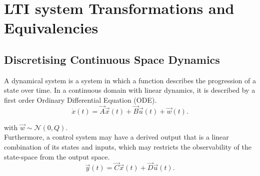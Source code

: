 \documentclass[runningheads,a4paper]{llncs}
\begin{document}
\newpage
\appendix
\section{LTI system Transformations and Equivalencies} \label{sec:appendix}

\subsection{Discretising Continuous Space Dynamics}

A dynamical system is a system in which a function describes the progression of a state over time. 
In a continuous domain with linear dynamics, it is described by a first order Ordinary Differential Equation (ODE).
\begin{equation}
\dot{x}(t)=\vec{A}\vec{x}(t)+\vec{B}\vec{u}(t) +\vec{w}(t).
\label{eq:dynamical}
\end{equation}

\noindent with $\vec{w} \sim \mathcal{N}(0,Q)$.\\
Furthermore, a control system may have a derived output that is a linear combination of its states and inputs, 
which may restricts the observability of the state-space from the output space.
\begin{equation}
\vec{y}(t)=\vec{C}\vec{x}(t)+\vec{D}\vec{u}(t).
\end{equation}
\end{document}
